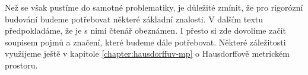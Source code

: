 Než se však pustíme do samotné problematiky, je důležité zmínit, že pro rigorózní budování budeme potřebovat některé základní znalosti. V dalším textu předpokladáme, že je s nimi čtenář obeznámen. I přesto si zde dovolíme začít soupisem pojmů a značení, které budeme dále potřebovat. Některé záležitosti využijeme ještě v kapitole \ref{chapter:hausdorffuv-mp} o Hausdorffově metrickém prostoru.





